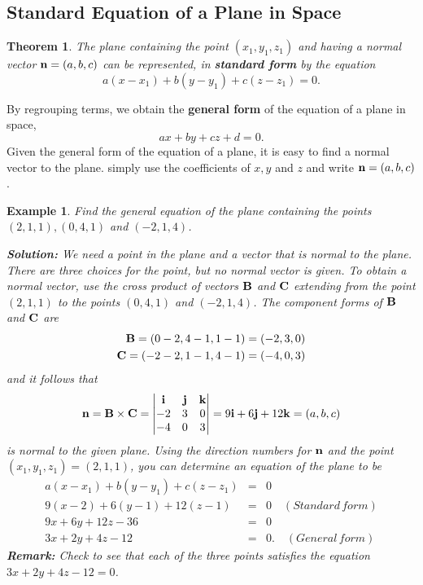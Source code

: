 \documentclass[titlepage,a4paper,12pt]{report}
\newtheorem{example}{Example}[section]
\newtheorem{theorem}{Theorem}[section]
\begin{document}
\subsection{Standard Equation of a Plane in Space}
\begin{theorem}
The plane containing the point $(x_1,y_1,z_1)$ and having a normal vector ${\bf{n}}=(a,b,c)$ can be represented, in \textbf{standard form} by the equation
\[a(x-x_1)+b(y-y_1)+c(z-z_1) = 0.\]
\end{theorem}
\noindent By regrouping terms, we obtain the \textbf{general form} of the equation of a plane in space, 
\[ax+by+cz+d=0.\]
Given the general form of the equation of a plane, it is easy to find a normal vector to the plane. simply use the coefficients of $x,y$ and $z$ and write ${\bf{n}}=(a,b,c)$.
\begin{example}
Find the general equation of the plane containing the points $(2,1,1), (0,4,1)$ and $(-2,1,4)$.

\noindent \textbf{Solution:} We need a point in the plane and a vector that is normal to the plane. There are three choices for the point, but no normal vector is given. To obtain a normal vector, use the cross product of vectors ${\bf{B}}$ and ${\bf{C}}$ extending from the point $(2,1,1)$ to the points $(0,4,1)$ and $(-2, 1,4)$. The component forms of ${\bf{B}}$ and ${\bf{C}}$ are 
\begin{eqnarray*}
{\bf{B}} =(0-2, 4-1, 1-1) =(-2,3,0)\\
{\bf{C}} =(-2-2,1-1,4-1)= (-4,0,3)
\end{eqnarray*}
and it follows that 
\[{\bf{n}=\bf{B}\times \bf{C}}=\begin{vmatrix}
{\bf{i}} & {\bf{j}} & {\bf{k}}\\
-2 & 3 & 0 \\
-4 & 0 & 3
\end{vmatrix}=9{\bf{i}}+6{\bf{j}}+12{\bf{k}}=(a,b,c)\] is normal to the given plane. Using the direction numbers for ${\bf{n}}$ and the point $(x_1,y_1,z_1)=(2,1,1)$, you can determine an equation of the plane to be 
\begin{eqnarray*}
a(x-x_1)+b(y-y_1)+c(z-z_1) &=& 0 \\
9(x-2)+6(y-1)+12(z-1) &=& 0 \quad (Standard\, form)\\
9x+6y+12z-36 &=& 0\\
3x+2y+4z-12 &=& 0. \quad (General\, form)
\end{eqnarray*}
\textbf{Remark:} Check to see that each of the three points satisfies the equation $3x+2y+4z-12=0$.
\end{example}
\end{document}
